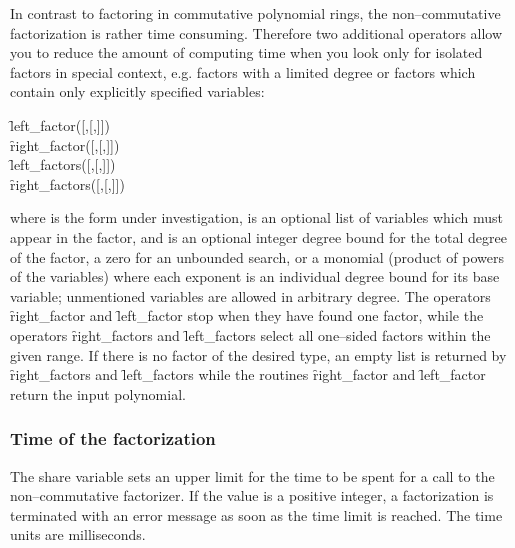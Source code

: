 \hypertarget{operator:LEFT_FACTOR}{}
\hypertarget{operator:RIGHT_FACTOR}{}
\hypertarget{operator:LEFT_FACTORS}{}
\hypertarget{operator:RIGHT_FACTORS}{}
In contrast to factoring in commutative polynomial rings, the non--commutative
factorization is rather time consuming. Therefore two additional
operators allow you to reduce the amount of computing time when
you look only for isolated factors in special context, e.g. factors
with a limited degree or factors which contain only explicitly
specified variables:
\begin{syntaxtable}
   \f{left\_factor}([,[,]]) \\
   \f{right\_factor}([,[,]]) \\
   \f{left\_factors}([,[,]]) \\
   \f{right\_factors}([,[,]])
\end{syntaxtable}
where  is the form under investigation,
 is an optional list of variables which must appear in the
factor, and 
is an optional integer degree bound for the total degree of the
factor, a zero for an unbounded search, or a monomial
(product of powers of the variables) where each exponent
is an individual degree bound for its base variable; unmentioned
variables are allowed in arbitrary degree. The operators
\f{right\_factor} and \f{left\_factor} stop when they have found one factor, while
the operators \f{right\_factors} and \f{left\_factors} select all one--sided factors
within the given range. If there is no factor of the
desired type, an empty list is returned by \f{right\_factors} and \f{left\_factors}
while the routines \f{right\_factor} and \f{left\_factor} return the input polynomial.

\subsubsection{Time of the factorization}

\hypertarget{variable:NC_FACTOR_TIME}{}
The share variable  sets an upper limit
for the time to be spent for a call to the non--commutative
factorizer. If the value is a positive integer, a
factorization is terminated with an error message as soon
as the time limit is reached. The time units are milliseconds.

